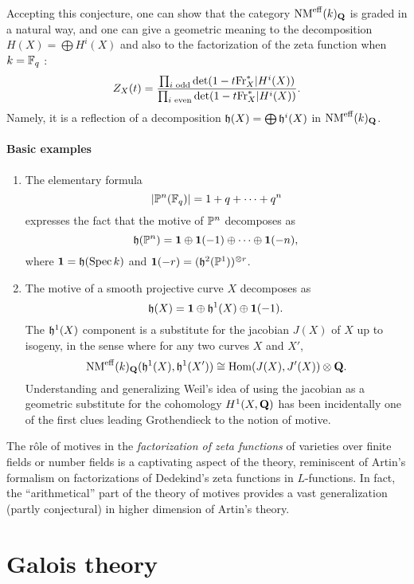 \documentclass[../main.tex]{subfiles}
\begin{document}
Accepting this conjecture, one can show that the category $\NM^{\eff}(k)_{\Q}$ is graded in a natural way, and one can give a geometric meaning to the decomposition $H(X) = \bigoplus H^i(X)$ and also to the factorization of the zeta function when $k = \F_q$ :
$$Z_X(t) = \frac{\prod_{i\text{ odd}} \det(1 - t\Fr_X^* | H^i(X))}{\prod_{i\text{ even}} \det(1 - t\Fr_X^* | H^i(X))}.$$
Namely, it is a reflection of a decomposition $\h(X) = \bigoplus \h^i(X)$ in $\NM^{\eff}(k)_{\Q}$.

\paragraph*{Basic examples}
\begin{enumerate}
    \item The elementary formula
    $$|\P^n(\F_q)| = 1 + q + \dots + q^n$$
    expresses the fact that the motive of $\P^n$ decomposes as
    $$\h(\P^n) = \1 \oplus \1(-1) \oplus \dots \oplus \1(-n),$$
    where $\1 = \h(\Spec k)$ and $\1(-r) = (\h^2(\P^1))^{\otimes r}$.

    \item The motive of a smooth projective curve $X$ decomposes as
    $$\h(X) = \1 \oplus \h^1(X) \oplus \1(-1).$$
    The $\h^1(X)$ component is a substitute for the jacobian $J(X)$ of $X$ up to isogeny, in the sense where for any two curves $X$ and $X'$,
    $$\NM^{\eff}(k)_{\Q}(\h^1(X), \h^1(X')) \cong \Hom(J(X), J'(X)) \otimes \Q.$$
    Understanding and generalizing Weil's idea of using the jacobian as a geometric substitute for the cohomology $H^1(X, \Q)$ has been incidentally one of the first clues leading Grothendieck to the notion of motive.
\end{enumerate}

The rôle of motives in the \emph{factorization of zeta functions} of varieties over finite fields or number fields is a captivating aspect of the theory, reminiscent of Artin's formalism on factorizations of Dedekind's zeta functions in $L$-functions.
In fact, the \enquote{arithmetical} part of the theory of motives provides a vast generalization (partly conjectural) in higher dimension of Artin's theory.

\section{Galois theory}
\end{document}
